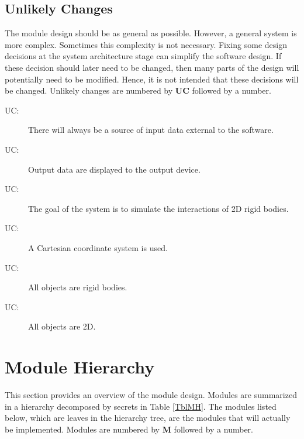 \documentclass[12pt]{article}
\newcounter{ucnum}
\newcommand{\uctheucnum}{UC\theucnum}
\newcommand{\olu}[1]{\authornote{red}{OO}{#1}}
\begin{document}
\subsection{Unlikely Changes} \label{SecUchange}

The module design should be as general as possible. However, a general system is
more complex. Sometimes this complexity is not necessary. Fixing some design
decisions at the system architecture stage can simplify the software design. If
these decision should later need to be changed, then many parts of the design
will potentially need to be modified. Hence, it is not intended that these
decisions will be changed.  Unlikely changes are numbered by \textbf{UC}
followed by a number.

\begin{description}
\item[ \uctheucnum \label{ucInput}:] There will always be a source of input data external to the software.
\item[ \uctheucnum \label{ucOutput}:] Output data are
  displayed to the output device.
\item[ \uctheucnum \label{ucGoal}:] The goal of the system is to simulate the interactions of 2D rigid bodies.
\item[ \uctheucnum \label{ucCartesian}:] A Cartesian 
coordinate system is used.
\item[ \uctheucnum \label{ucRigid}:] All objects
are rigid bodies.
\item[ \uctheucnum \label{uc2D}:] All objects
are 2D.
\end{description}

\section{Module Hierarchy} \label{SecMH}

This section provides an overview of the module design. Modules are summarized
in a hierarchy decomposed by secrets in Table \ref{TblMH}. The modules listed
below, which are leaves in the hierarchy tree, are the modules that will
actually be implemented.  Modules are numbered by \textbf{M}
followed by a number.
\end{document}
